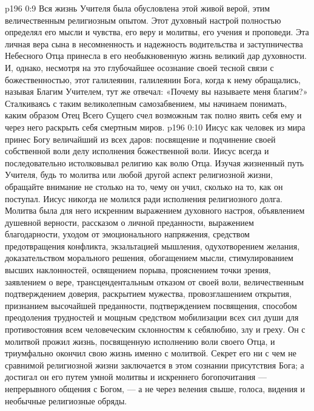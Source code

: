 \vs p196 0:9 Вся жизнь Учителя была обусловлена этой живой верой, этим величественным религиозным опытом. Этот духовный настрой полностью определял его мысли и чувства, его веру и молитвы, его учения и проповеди. Эта личная вера сына в несомненность и надежность водительства и заступничества Небесного Отца принесла в его необыкновенную жизнь великий дар духовности. И, однако, несмотря на это глубочайшее осознание своей тесной связи с божественностью, этот галилеянин, галилеянин Бога, когда к нему обращались, называя Благим Учителем, тут же отвечал: «Почему вы называете меня благим?» Сталкиваясь с таким великолепным самозабвением, мы начинаем понимать, каким образом Отец Всего Сущего счел возможным так полно явить себя ему и через него раскрыть себя смертным миров.
\vs p196 0:10 Иисус как человек из мира принес Богу величайший из всех даров: посвящение и подчинение своей собственной воли делу исполнения божественной воли. Иисус всегда и последовательно истолковывал религию как волю Отца. Изучая жизненный путь Учителя, будь то молитва или любой другой аспект религиозной жизни, обращайте внимание не столько на то, чему он учил, сколько на то, как он поступал. Иисус никогда не молился ради исполнения религиозного долга. Молитва была для него искренним выражением духовного настроя, объявлением душевной верности, рассказом о личной преданности, выражением благодарности, уходом от эмоционального напряжения, средством предотвращения конфликта, экзальтацией мышления, одухотворением желания, доказательством морального решения, обогащением мысли, стимулированием высших наклонностей, освящением порыва, прояснением точки зрения, заявлением о вере, трансцендентальным отказом от своей воли, величественным подтверждением доверия, раскрытием мужества, провозглашением открытия, признанием высочайшей преданности, подтверждением посвящения, способом преодоления трудностей и мощным средством мобилизации всех сил души для противостояния всем человеческим склонностям к себялюбию, злу и греху. Он с молитвой прожил жизнь, посвященную исполнению воли своего Отца, и триумфально окончил свою жизнь именно с молитвой. Секрет его ни с чем не сравнимой религиозной жизни заключается в этом сознании присутствия Бога; а достигал он его путем умной молитвы и искреннего богопочитания --- непрерывного общения с Богом, --- а не через веления свыше, голоса, видения и необычные религиозные обряды.

